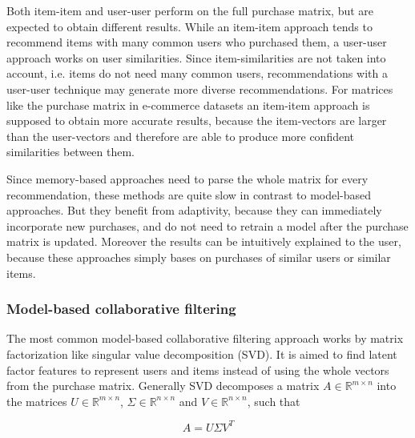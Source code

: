 \documentclass[10pt]{reportMaster}
\begin{document}
Both item-item and user-user perform on the full purchase matrix, but are expected to obtain different results.
While an item-item approach tends to recommend items with many common users who purchased them, a user-user approach works on user similarities.
Since item-similarities are not taken into account, i.e. items do not need many common users, recommendations with a user-user technique may generate more diverse recommendations.
For matrices like the purchase matrix in e-commerce datasets an item-item approach is supposed to obtain more accurate results, because the item-vectors are larger than the user-vectors and therefore are able to produce more confident similarities between them. 

Since memory-based approaches need to parse the whole matrix for every recommendation, these methods are quite slow in contrast to model-based approaches.
But they benefit from adaptivity, because they can immediately incorporate new purchases, and do not need to retrain a model after the purchase matrix is updated.
Moreover the results can be intuitively explained to the user, because these approaches simply bases on purchases of similar users or similar items.

\subsubsection{Model-based collaborative filtering}
\label{sec:modelBasedCF}
The most common model-based collaborative filtering approach works by matrix factorization like singular value decomposition (SVD).
It is aimed to find latent factor features to represent users and items instead of using the whole vectors from the purchase matrix.
Generally SVD decomposes a matrix $A \in \mathds{R}^{m \times n}$ into the matrices $U \in \mathds{R}^{m \times n}$, $\Sigma \in \mathds{R}^{n \times n}$ and $V \in \mathds{R}^{n \times n}$, such that 

\begin{equation}
	A = U \Sigma V^T
\end{equation}
\end{document}

